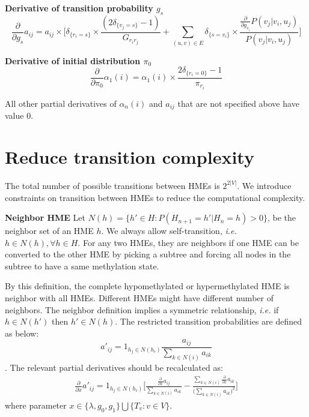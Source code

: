 \documentclass[11pt]{article}
\begin{document}
\noindent\textbf{Derivative of transition probability $g_s$}
\begin{equation*}
\frac{\partial}{\partial g_s}a_{ij} =
a_{ij} \times\big[ \delta_{\{r_i=s\}}\times\frac{(2\delta_{\{v_j=s\}}-1)}{G_{r_ir_j}} + \sum_{(u,v)\in E} \delta_{\{s=v_i\}}\times\frac{\frac{\partial}{\partial g_{v_i}}P(v_j|v_i,u_j)}{P(v_j|v_i,u_j)} \big]
\end{equation*}

\noindent\textbf{Derivative of initial distribution $\pi_0$}
\begin{equation*}
\frac{\partial}{\partial \pi_0}\alpha_1(i) = \alpha_1(i)\times\frac{2\delta_{\{r_i=0\}}-1}{\pi_{r_i}}
\end{equation*}

All other partial derivatives of $\alpha_n(i)$ and $a_{ij}$ that are
not specified above have value 0.

\section{Reduce transition complexity}
The total number of possible transitions between HMEs is $2^{2|V|}$. We
introduce constraints on transition between HMEs to reduce the
computational complexity.

\textbf{Neighbor HME} Let $N(h)=\{h'\in H: P(H_{n+1}=h'|H_n=h) > 0\}$,
be the neighbor set of an HME $h$. We always allow self-transition,
\textit{i.e.} $h\in N(h), \forall h\in H$. For any two HMEs, they are
neighbors if one HME can be converted to the other HME by picking a
subtree and forcing all nodes in the subtree to have a same
methylation state.

By this definition, the complete hypomethylated or hypermethylated HME
is neighbor with all HMEs. Different HMEs might have different number
of neighbors.  The neighbor definition implies a symmetric
relationship, \textit{i.e.} if $h\in N(h')$ then $h'\in N(h)$. The
restricted transition probabilities are defined as below:
$$a'_{ij} =1_{h_j\in N(h_i)} \frac{a_{ij}}{\sum_{k\in N(i)} a_{ik}}$$.
The relevant partial derivatives should be recalculated as:
\begin{gather*}
\frac{\partial}{\partial x} a'_{ij} = 1_{h_j\in N(h_i)}
\bigg[ \frac{\frac{\partial}{\partial x} a_{ij}}{\sum_{k\in N(i)} a_{ik}} -
 \frac{\sum_{k\in N(i)}\frac{\partial}{\partial x} a_{ik}}{\big(\sum_{k\in N(i)} a_{ik}\big)^2 }\bigg]
\end{gather*}
where parameter $x\in\{\lambda, g_0, g_1\}\bigcup\{T_v:v\in V\}$.


\end{document}
